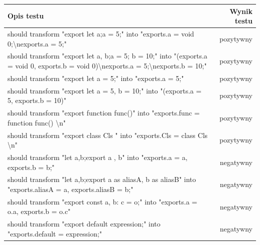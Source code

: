\documentclass{SGGW-thesis}
\begin{document}
\begin{longtable}{@{\extracolsep{\fill}}|p{}|r|@{} }
    \hline
    \textbf{Opis testu}                                                                                                                                              & \textbf{Wynik testu} \\ \hline
    \endfirsthead
    \endhead
    should transform "export let a;a = 5;" into "exports.a = void 0;\textbackslash{}nexports.a = 5;"                                                                    & pozytywny            \\ \hline
    should transform "export let a, b;a = 5; b = 10;" into "(exports.a = void 0, exports.b = void 0)\textbackslash{}nexports.a = 5;\textbackslash{}nexports.b = 10;"    & pozytywny            \\ \hline
    should transform "export let a = 5;" into "exports.a = 5;"                                                                                                          & pozytywny            \\ \hline
    should transform "export let a = 5, b = 10;" into "(exports.a = 5, exports.b = 10)"                                                                                 & pozytywny            \\ \hline
    should transform "export function func(){}" into "exports.func = function func() {\textbackslash{}n}"                                                               & pozytywny            \\ \hline
    should transform "export class Cls {}" into "exports.Cls = class Cls {\textbackslash{}n}"                                                                           & pozytywny            \\ \hline
    should transform "let a,b;export {a , b}" into "exports.a = a, exports.b = b;"                                                                                      & negatywny            \\ \hline
    should transform "let a,b;export {a as aliasA, b as aliasB}" into "exports.aliasA = a, exports.aliasB = b;"                                                         & negatywny            \\ \hline
    should transform "export const { a, b: c } = o;" into "exports.a = o.a, exports.b = o.c"                                                                            & negatywny            \\ \hline
    should transform "export default expression;" into "exports.default = expression;"                                                                                  & negatywny            \\ \hline

\end{longtable}
\end{document}
